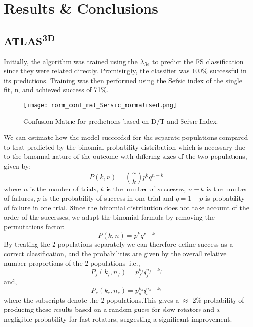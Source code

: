\chapter{Results \& Conclusions}

\label{ch:results}

\section{ATLAS\textsuperscript{3D}}
Initially, the algorithm was trained using the $\lambda_{Re}$ to predict the FS classification since they were related directly. Promisingly, the classifier was 100\% successful in its predictions. Training was then performed using the Se\'rsic index of the single fit, n, and achieved success of 71\%.
\begin{figure}[h!]
	\centering
	\texttt{[image: norm\_conf\_mat\_Sersic\_normalised.png]}
	\caption{Confusion Matric for predictions based on D/T and Se\'rsic Index.
	}
	\label{fig:confmatDT}
\end{figure}
We can estimate how the model succeeded for the separate populations compared to that predicted by the binomial probability distribution which is necessary due to the binomial nature of the outcome with differing sizes of the two populations, given by\cite{simmons_2016}:
\begin{equation}
P(k,n) = \binom{n}{k}p^{k}q^{n-k}
\end{equation}
where $n$ is the number of trials, $k$ is the number of successes, $n-k$ is the number of failures, $p$ is the probability of success in one trial and $q=1-p$ is probability of failure in one trial. Since the binomial distribution does not take account of the order of the successes, we adapt the binomial formula by removing the permutations factor:
\begin{equation}
P(k,n) = p^{k}q^{n-k}
\end{equation}
By treating the 2 populations separately we can therefore define success as a correct classification, and the probabilities are given by the overall relative number proportions of the 2 populations, i.e.,
\begin{equation}
P_{f}(k_{f},n_{f}) = p_{f}^{k_{f}}q_{f}^{n_{f}-k_{f}}
\end{equation}
and,
\begin{equation}
P_{s}(k_{s},n_{s}) = p_{s}^{k_{s}}q_{s}^{n_{s}-k_{s}}
\end{equation}
where the subscripts denote the 2 populations.This gives a $\approx$ 2\% probability of producing these results based on a random guess for slow rotators and a negligible probability for fast rotators, suggesting a significant improvement.\
